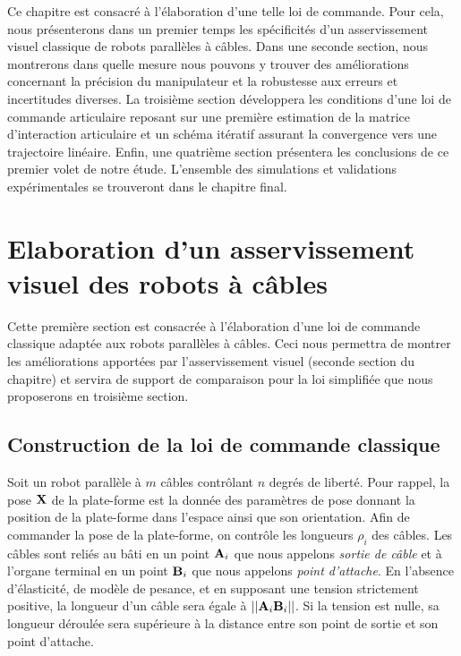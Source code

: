 Ce chapitre est consacré à l'élaboration d'une telle loi de commande. Pour cela, nous présenterons dans un premier temps les spécificités d'un asservissement visuel classique de robots parallèles à câbles. Dans une seconde section, nous montrerons dans quelle mesure nous pouvons y trouver des améliorations concernant la précision du manipulateur et la robustesse aux erreurs et incertitudes diverses. La troisième section développera les conditions d'une loi de commande articulaire reposant sur une première estimation de la matrice d'interaction articulaire et un schéma itératif assurant la convergence vers une trajectoire linéaire. Enfin, une quatrième section présentera les conclusions de ce premier volet de notre étude. L'ensemble des simulations et validations expérimentales se trouveront dans le chapitre final.

\section{Elaboration d'un asservissement visuel des robots à c\^ables}

Cette première section est consacrée à l'élaboration d'une loi de commande classique adaptée aux robots parallèles à câbles. Ceci nous permettra de montrer les améliorations apportées par l'asservissement visuel (seconde section du chapitre) et servira de support de comparaison pour la loi simplifiée que nous proposerons en troisième section.

\subsection{Construction de la loi de commande classique}

Soit un robot parallèle à $m$ câbles contrôlant $n$ degrés de liberté. Pour rappel, la pose ${\bf X}$ de la plate-forme est la donnée des paramètres de pose donnant la position de la plate-forme dans l'espace ainsi que son orientation. Afin de commander la pose de la plate-forme, on contrôle les longueurs $\rho_i$ des câbles. Les câbles sont reliés au bâti en un point ${\bf A}_i$ que nous appelons {\it sortie de câble} et à l'organe terminal en un point ${\bf B}_i$ que nous appelons {\it point d'attache}. En l'absence d'élasticité, de modèle de pesance, et en supposant une tension strictement positive, la longueur d'un câble sera égale à $||{\bf A}_i{\bf B}_i||$. Si la tension est nulle, sa longueur déroulée sera supérieure à la distance entre son point de sortie et son point d'attache.

